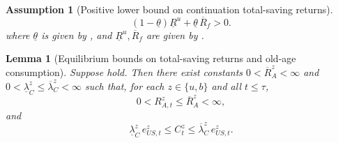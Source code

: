 \documentclass[12pt]{article}
\theoremstyle{plain}
\newtheorem{ass}{Assumption}
\newtheorem{lem}{Lemma}
\begin{document}
\begin{ass}[Positive lower bound on continuation total-saving returns]\label{ass_positive_u_total_saving_return}
\[
(1-\underline\theta)\underline R^u+\underline\theta\,\overline R_f>0.
\]
where $\underline\theta$ is given by , and
$\underline R^u,\overline R_f$ are given by
.
\end{ass}

\begin{lem}[Equilibrium bounds on total-saving returns and old-age consumption]\label{lem_total_return_consumption_bounds}
Suppose
hold.
Then there exist constants $0< \overline R^z_A<\infty$ and
$0<\underline\lambda^z_C\le \overline\lambda^z_C<\infty$ such that, for each $z\in\{u,b\}$ and all $t\le\tau$,
\[
0< R_{A,t}^z\le \overline R^z_A<\infty,
\]
and
\[
\underline\lambda^z_C\,e_{US,t}^z
\le
C_t^z
\le
\overline\lambda^z_C\,e_{US,t}^z.
\]
\end{lem}
\end{document}
